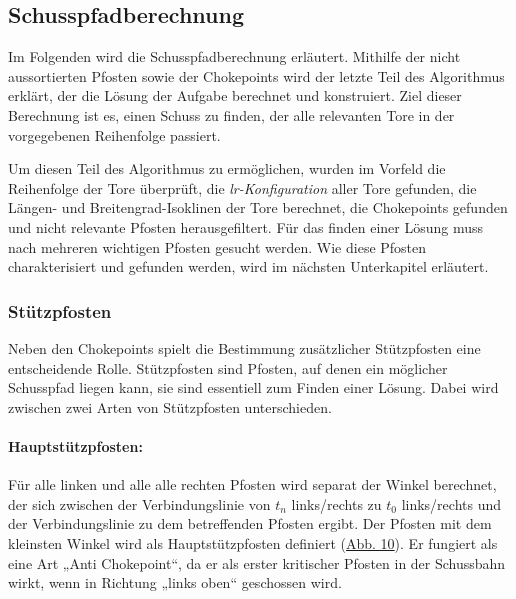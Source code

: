 \subsection{Schusspfadberechnung}
\label{sec:anfang_3}
Im Folgenden wird die Schusspfadberechnung erläutert. Mithilfe der nicht aussortierten Pfosten sowie der Chokepoints wird der letzte Teil des Algorithmus erklärt, der die Lösung der Aufgabe berechnet und konstruiert. Ziel dieser Berechnung ist es, einen Schuss zu finden, der alle relevanten Tore in der vorgegebenen Reihenfolge passiert.

Um diesen Teil des Algorithmus zu ermöglichen, wurden im Vorfeld die Reihenfolge der Tore überprüft, die \textit{lr-Konfiguration} aller Tore gefunden, die Längen- und Breitengrad-Isoklinen der Tore berechnet, die Chokepoints gefunden und nicht relevante Pfosten herausgefiltert. Für das finden einer Lösung muss nach mehreren wichtigen Pfosten gesucht werden. Wie diese Pfosten charakterisiert und gefunden werden, wird im nächsten Unterkapitel erläutert.


\newpage
\subsubsection{Stützpfosten} 
Neben den Chokepoints spielt die Bestimmung zusätzlicher Stützpfosten eine entscheidende Rolle. Stützpfosten sind Pfosten, auf denen ein möglicher Schusspfad liegen kann, sie sind essentiell zum Finden einer Lösung. Dabei wird zwischen zwei Arten von Stützpfosten unterschieden.

\paragraph{Hauptstützpfosten:}
Für alle linken und alle alle rechten Pfosten wird separat der Winkel berechnet, der sich zwischen der Verbindungslinie von $t_n$ links/rechts zu $t_0$ links/rechts und der Verbindungslinie zu dem betreffenden Pfosten ergibt. Der Pfosten mit dem kleinsten Winkel wird als Hauptstützpfosten definiert (\hyperref[fig:hauptpfosten]{Abb. 10}). Er fungiert als eine Art „Anti Chokepoint“, da er als erster kritischer Pfosten in der Schussbahn wirkt, wenn in Richtung „links oben“ geschossen wird. 

